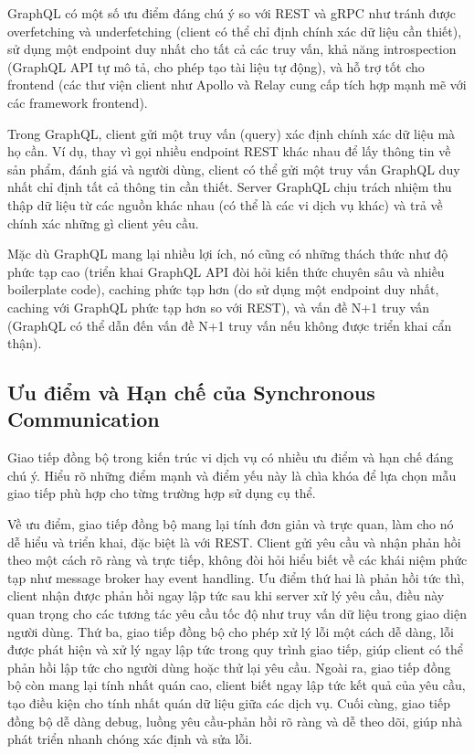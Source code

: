 GraphQL có một số ưu điểm đáng chú ý so với REST và gRPC như tránh được overfetching và underfetching (client có thể chỉ định chính xác dữ liệu cần thiết), sử dụng một endpoint duy nhất cho tất cả các truy vấn, khả năng introspection (GraphQL API tự mô tả, cho phép tạo tài liệu tự động), và hỗ trợ tốt cho frontend (các thư viện client như Apollo và Relay cung cấp tích hợp mạnh mẽ với các framework frontend).

Trong GraphQL, client gửi một truy vấn (query) xác định chính xác dữ liệu mà họ cần. Ví dụ, thay vì gọi nhiều endpoint REST khác nhau để lấy thông tin về sản phẩm, đánh giá và người dùng, client có thể gửi một truy vấn GraphQL duy nhất chỉ định tất cả thông tin cần thiết. Server GraphQL chịu trách nhiệm thu thập dữ liệu từ các nguồn khác nhau (có thể là các vi dịch vụ khác) và trả về chính xác những gì client yêu cầu.

Mặc dù GraphQL mang lại nhiều lợi ích, nó cũng có những thách thức như độ phức tạp cao (triển khai GraphQL API đòi hỏi kiến thức chuyên sâu và nhiều boilerplate code), caching phức tạp hơn (do sử dụng một endpoint duy nhất, caching với GraphQL phức tạp hơn so với REST), và vấn đề N+1 truy vấn (GraphQL có thể dẫn đến vấn đề N+1 truy vấn nếu không được triển khai cẩn thận).

\subsection{Ưu điểm và Hạn chế của Synchronous Communication}
Giao tiếp đồng bộ trong kiến trúc vi dịch vụ có nhiều ưu điểm và hạn chế đáng chú ý. Hiểu rõ những điểm mạnh và điểm yếu này là chìa khóa để lựa chọn mẫu giao tiếp phù hợp cho từng trường hợp sử dụng cụ thể.

Về ưu điểm, giao tiếp đồng bộ mang lại tính đơn giản và trực quan, làm cho nó dễ hiểu và triển khai, đặc biệt là với REST. Client gửi yêu cầu và nhận phản hồi theo một cách rõ ràng và trực tiếp, không đòi hỏi hiểu biết về các khái niệm phức tạp như message broker hay event handling. Ưu điểm thứ hai là phản hồi tức thì, client nhận được phản hồi ngay lập tức sau khi server xử lý yêu cầu, điều này quan trọng cho các tương tác yêu cầu tốc độ như truy vấn dữ liệu trong giao diện người dùng. Thứ ba, giao tiếp đồng bộ cho phép xử lý lỗi một cách dễ dàng, lỗi được phát hiện và xử lý ngay lập tức trong quy trình giao tiếp, giúp client có thể phản hồi lập tức cho người dùng hoặc thử lại yêu cầu. Ngoài ra, giao tiếp đồng bộ còn mang lại tính nhất quán cao, client biết ngay lập tức kết quả của yêu cầu, tạo điều kiện cho tính nhất quán dữ liệu giữa các dịch vụ. Cuối cùng, giao tiếp đồng bộ dễ dàng debug, luồng yêu cầu-phản hồi rõ ràng và dễ theo dõi, giúp nhà phát triển nhanh chóng xác định và sửa lỗi.

